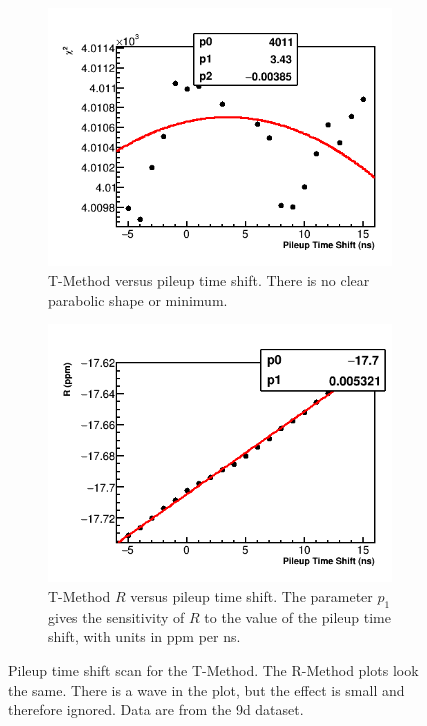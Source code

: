\begin{figure}[h]
\centering
    \begin{subfigure}[t]{0.45\textwidth}
        \centering
        \includegraphics[width=\textwidth]{TMethod_Chi2_Vs_PileupTimeShift_Canv}
        \caption{T-Method \chisq versus pileup time shift. There is no clear parabolic shape or minimum.}
    \end{subfigure}%
    \hspace{1cm}
    \begin{subfigure}[t]{0.45\textwidth}
        \centering
        \includegraphics[width=\textwidth]{TMethod_R_Vs_PileupTimeShift_Canv}
        \caption{T-Method $R$ versus pileup time shift. The parameter $p_{1}$ gives the sensitivity of $R$ to the value of the pileup time shift, with units in ppm per ns.}
    \end{subfigure}
\caption[Pileup time shift scan]{Pileup time shift scan for the T-Method. The R-Method plots look the same. There is a wave in the \R plot, but the effect is small and therefore ignored. Data are from the 9d dataset.}
\label{fig:PTSscan}
\end{figure}


